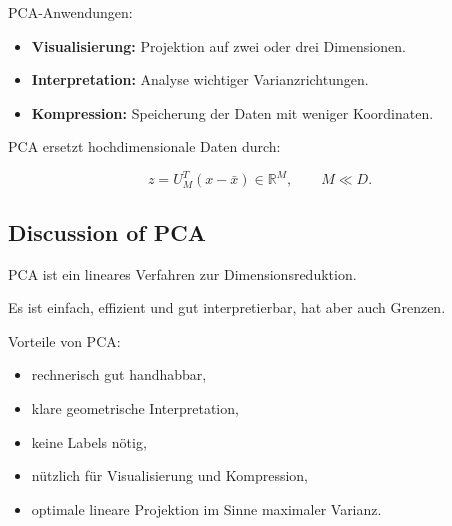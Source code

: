 \documentclass[11pt,a4paper]{scrartcl}
\begin{document}
\begin{answerbox}
    PCA-Anwendungen:

    \begin{itemize}
        \item \textbf{Visualisierung:}
        Projektion auf zwei oder drei Dimensionen.

        \item \textbf{Interpretation:}
        Analyse wichtiger Varianzrichtungen.

        \item \textbf{Kompression:}
        Speicherung der Daten mit weniger Koordinaten.
    \end{itemize}

    PCA ersetzt hochdimensionale Daten durch:

    \[
        \boxed{
            z = U_M^T(x-\bar x)
            \in \mathbb{R}^M,
            \qquad
            M \ll D.
        }
    \]
\end{answerbox}

\subsection{Discussion of PCA}

\begin{notebox}
    PCA ist ein lineares Verfahren zur Dimensionsreduktion.

    Es ist einfach, effizient und gut interpretierbar, hat aber auch Grenzen.
\end{notebox}

\begin{solutionbox}
    Vorteile von PCA:

    \begin{itemize}
        \item rechnerisch gut handhabbar,
        \item klare geometrische Interpretation,
        \item keine Labels nötig,
        \item nützlich für Visualisierung und Kompression,
        \item optimale lineare Projektion im Sinne maximaler Varianz.
    \end{itemize}
\end{solutionbox}
\end{document}

